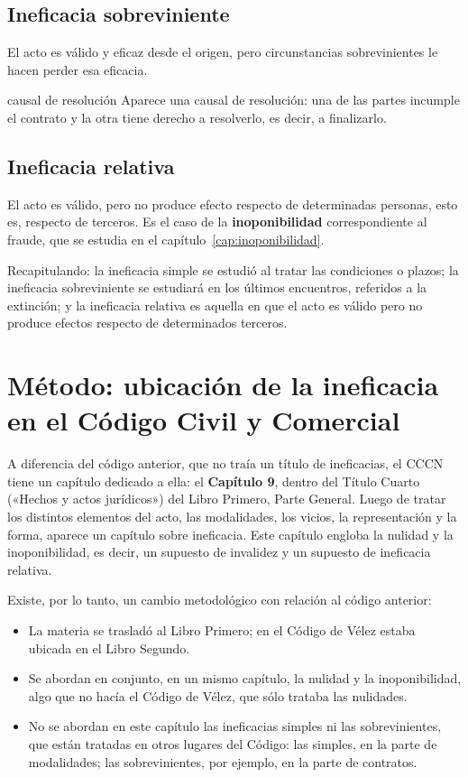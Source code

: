 \documentclass[12pt,oneside]{book}
\begin{document}
\subsection{Ineficacia sobreviniente}

El acto es válido y eficaz desde el origen, pero circunstancias sobrevinientes le hacen perder esa eficacia.

\begin{example}{causal de resolución}
Aparece una causal de resolución: una de las partes incumple el contrato y la otra tiene derecho a resolverlo, es decir, a finalizarlo.
\end{example}

\subsection{Ineficacia relativa}

El acto es válido, pero no produce efecto respecto de determinadas personas, esto es, respecto de terceros. Es el caso de la \textbf{inoponibilidad} correspondiente al fraude, que se estudia en el capítulo~\ref{cap:inoponibilidad}.

Recapitulando: la ineficacia simple se estudió al tratar las condiciones o plazos; la ineficacia sobreviniente se estudiará en los últimos encuentros, referidos a la extinción; y la ineficacia relativa es aquella en que el acto es válido pero no produce efectos respecto de determinados terceros.

\section{Método: ubicación de la ineficacia en el Código Civil y Comercial}

A diferencia del código anterior, que no traía un título de ineficacias, el CCCN tiene un capítulo dedicado a ella: el \textbf{Capítulo 9}, dentro del Título Cuarto («Hechos y actos jurídicos») del Libro Primero, Parte General. Luego de tratar los distintos elementos del acto, las modalidades, los vicios, la representación y la forma, aparece un capítulo sobre ineficacia. Este capítulo engloba la nulidad y la inoponibilidad, es decir, un supuesto de invalidez y un supuesto de ineficacia relativa.

Existe, por lo tanto, un cambio metodológico con relación al código anterior:

\begin{itemize}
    \item La materia se trasladó al Libro Primero; en el Código de Vélez estaba ubicada en el Libro Segundo.
    \item Se abordan en conjunto, en un mismo capítulo, la nulidad y la inoponibilidad, algo que no hacía el Código de Vélez, que sólo trataba las nulidades.
    \item No se abordan en este capítulo las ineficacias simples ni las sobrevinientes, que están tratadas en otros lugares del Código: las simples, en la parte de modalidades; las sobrevinientes, por ejemplo, en la parte de contratos.
\end{itemize}
\end{document}
